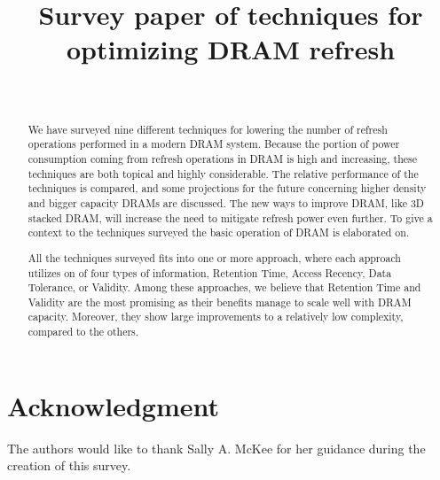 \documentclass[journal, a4paper]{IEEEtran}
\begin{document}
\title{Survey paper of techniques for optimizing DRAM refresh}

\author{\\
}

\maketitle


\begin{abstract}
We have surveyed nine different techniques for lowering the number of refresh operations performed in a modern DRAM system. Because the portion of power consumption coming from refresh operations in DRAM is high and increasing, these techniques are both topical and highly considerable. The relative performance of the techniques is compared, and some projections for the future concerning higher density and bigger capacity DRAMs are discussed. The new ways to improve DRAM, like 3D stacked DRAM, will increase the need to mitigate refresh power even further. To give a context to the techniques surveyed the basic operation of DRAM is elaborated on. 

All the techniques surveyed fits into one or more approach, where each approach utilizes on of four types of information, Retention Time, Access Recency, Data Tolerance, or Validity. Among these approaches, we believe that Retention Time and Validity are the most promising as their benefits manage to scale well with DRAM capacity. Moreover, they show large improvements to a relatively low complexity, compared to the others.
\end{abstract}







\section*{Acknowledgment}
The authors would like to thank Sally A. McKee for her guidance during the creation of this survey.



\IEEEtriggercmd{\newpage}




\end{document}
